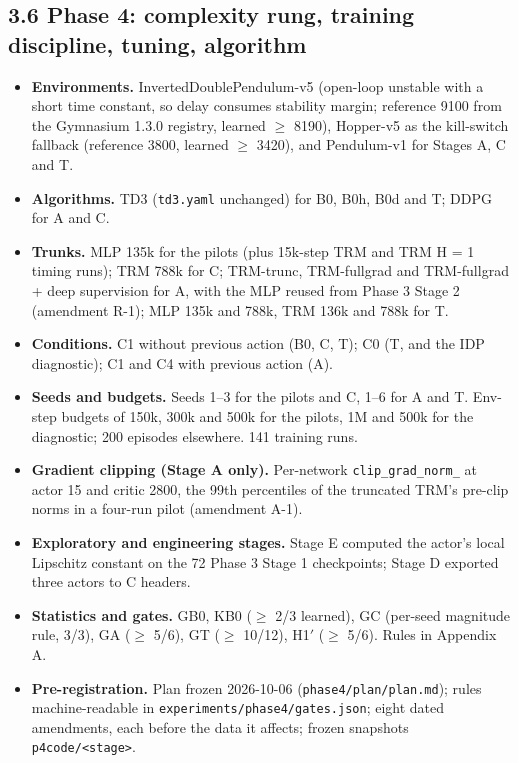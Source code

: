 \documentclass[11pt]{article}
\begin{document}
\subsection*{3.6 Phase 4: complexity rung, training discipline, tuning, algorithm}



\begin{itemize}
\item \textbf{Environments.} InvertedDoublePendulum-v5 (open-loop unstable with a short time constant, so delay consumes stability margin; reference 9100 from the Gymnasium 1.3.0 registry, learned $\geq$ 8190), Hopper-v5 as the kill-switch fallback (reference 3800, learned $\geq$ 3420), and Pendulum-v1 for Stages A, C and T.
\item \textbf{Algorithms.} TD3 (\texttt{td3.yaml} unchanged) for B0, B0h, B0d and T; DDPG for A and C.
\item \textbf{Trunks.} MLP 135k for the pilots (plus 15k-step TRM and TRM H = 1 timing runs); TRM 788k for C; TRM-trunc, TRM-fullgrad and TRM-fullgrad + deep supervision for A, with the MLP reused from Phase 3 Stage 2 (amendment R-1); MLP 135k and 788k, TRM 136k and 788k for T.
\item \textbf{Conditions.} C1 without previous action (B0, C, T); C0 (T, and the IDP diagnostic); C1 and C4 with previous action (A).
\item \textbf{Seeds and budgets.} Seeds 1--3 for the pilots and C, 1--6 for A and T. Env-step budgets of 150k, 300k and 500k for the pilots, 1M and 500k for the diagnostic; 200 episodes elsewhere. 141 training runs.
\item \textbf{Gradient clipping (Stage A only).} Per-network \texttt{clip\_\allowbreak{}grad\_\allowbreak{}norm\_\allowbreak{}} at actor 15 and critic 2800, the 99th percentiles of the truncated TRM's pre-clip norms in a four-run pilot (amendment A-1).
\item \textbf{Exploratory and engineering stages.} Stage E computed the actor's local Lipschitz constant on the 72 Phase 3 Stage 1 checkpoints; Stage D exported three actors to C headers.
\item \textbf{Statistics and gates.} GB0, KB0 ($\geq$ 2/3 learned), GC (per-seed magnitude rule, 3/3), GA ($\geq$ 5/6), GT ($\geq$ 10/12), H1$'$ ($\geq$ 5/6). Rules in Appendix A.
\item \textbf{Pre-registration.} Plan frozen 2026-10-06 (\texttt{phase4/\allowbreak{}plan/\allowbreak{}plan.\allowbreak{}md}); rules machine-readable in \texttt{experiments/\allowbreak{}phase4/\allowbreak{}gates.\allowbreak{}json}; eight dated amendments, each before the data it affects; frozen snapshots \texttt{p4code/\allowbreak{}<stage>}.

\end{itemize}
\end{document}
